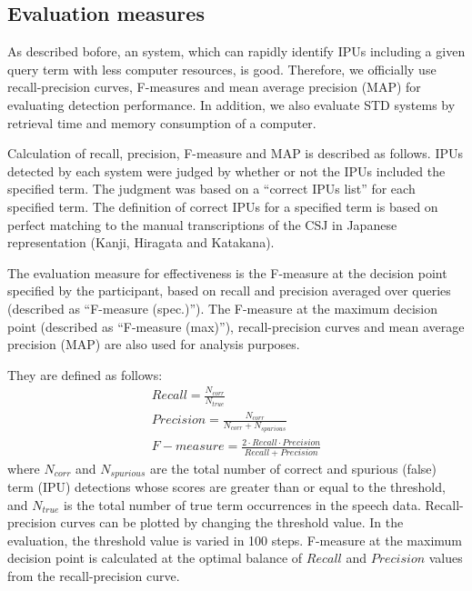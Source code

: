 \documentclass[english]{jnlp_1.4}
\begin{document}
\subsection{Evaluation measures}

As described bofore, an system, which can rapidly identify IPUs
including a given query term with less computer resources, is good. 
Therefore, we officially use recall-precision curves, F-measures and
mean average precision (MAP) for evaluating detection performance. In
addition, we also evaluate STD systems by retrieval time and memory
consumption of a computer. 

Calculation of recall, precision, F-measure and MAP is described as
follows. 
IPUs detected by each system were judged by whether or not the IPUs
included the specified term. 
The judgment was based on a ``correct IPUs list'' for each specified
term. 
The definition of correct IPUs for a specified term is 
based on perfect matching to the manual transcriptions of the CSJ
in Japanese representation (Kanji, Hiragata and Katakana).

The evaluation measure for effectiveness is the
F-measure at the decision point specified by the participant, based on
recall and precision averaged over queries (described as ``F-measure
(spec.)''). 
The F-measure at the maximum decision point (described as ``F-measure
(max)''), recall-precision curves and mean average precision (MAP) are
also used for analysis purposes. 

They are defined as follows:
\begin{gather}
Recall = \frac{N_{corr}}{N_{true}} \\[1ex]
Precision = \frac{N_{corr}}{N_{corr} + N_{spurious}} \\[1ex]
F-measure = \frac{2 \cdot Recall \cdot Precision}{Recall + Precision}
\end{gather}
where $N_{corr}$ and $N_{spurious}$ are the total number of correct and
spurious (false) term (IPU) detections whose scores are greater than or
equal to the threshold,
and $N_{true}$ is the total number of true term occurrences in the
speech data.
Recall-precision curves can be plotted by changing the threshold value.
In the evaluation, the threshold value is varied in 100 steps.
F-measure at the maximum decision point is calculated at the optimal
balance of $Recall$ and $Precision$ values from the recall-precision
curve.
\end{document}

